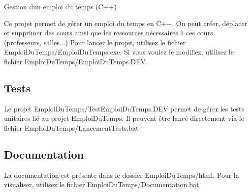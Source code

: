 Gestion d\textquotesingle{}un emploi du temps (C++)

Ce projet permet de gérer un emploi du temps en C++. On peut créer, déplacer et supprimer des cours ainsi que les ressources nécessaires à ces cours (professeurs, salles...) Pour lancer le projet, utilisez le fichier Emploi\+Du\+Temps/\+Emploi\+Du\+Temps.\+exe. Si vous voulez le modifiez, utilisez le fichier Emploi\+Du\+Temps/\+Emploi\+Du\+Temps.\+D\+EV.

\subsection*{Tests}

Le projet Emploi\+Du\+Temps/\+Test\+Emploi\+Du\+Temps.\+D\+EV permet de gérer les tests unitaires lié au projet Emploi\+Du\+Temps. Il peuvent être lancé directement via le fichier Emploi\+Du\+Temps/\+Lancement\+Tests.\+bat

\subsection*{Documentation}

La documentation est présente dans le dossier Emploi\+Du\+Temps/html. Pour la visualiser, utilisez le fichier Emploi\+Du\+Temps/\+Documentation.\+bat. 